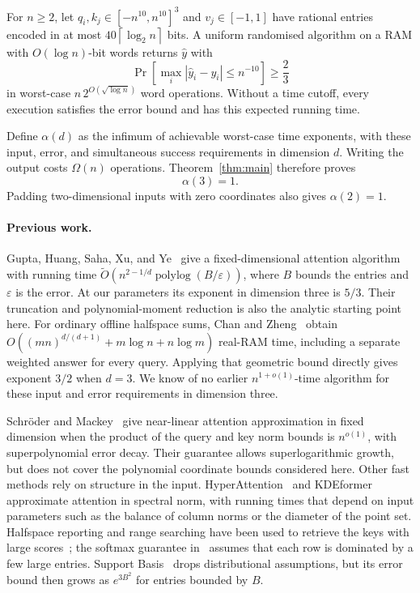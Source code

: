 \documentclass[notab,a4paper,UKenglish,numberwithinsect]{socg-lipics-v2021}
\newcommand{\polylog}{\operatorname{polylog}}
\newcommand{\eps}{\varepsilon}
\newcommand{\ceil}[1]{\left\lceil #1\right\rceil}
\begin{document}
\begin{theorem}\label{thm:main}
For $n\ge2$, let $q_i,k_j\in[-n^{10},n^{10}]^3$ and $v_j\in[-1,1]$ have rational entries encoded in at most $40\ceil{\log_2 n}$ bits. A uniform randomised algorithm on a RAM with $O(\log n)$-bit words returns $\widehat y$ with
\[
 \Pr\!\left[\max_i|\widehat y_i-y_i|\le n^{-10}\right]\ge\frac23
\]
in worst-case $n\,2^{O(\sqrt{\log n})}$ word operations. Without a time cutoff, every execution satisfies the error bound and has this expected running time.
\end{theorem}

Define $\alpha(d)$ as the infimum of achievable worst-case time exponents, with these input, error, and simultaneous success requirements in dimension $d$. Writing the output costs $\Omega(n)$ operations. Theorem~\ref{thm:main} therefore proves
\begin{equation}\label{eq:alpha}
 \alpha(3)=1.
\end{equation}
Padding two-dimensional inputs with zero coordinates also gives $\alpha(2)=1$.

\paragraph*{Previous work.}
Gupta, Huang, Saha, Xu, and Ye~\cite[Theorem 1.1]{gupta} give a fixed-dimensional attention algorithm with running time $\widetilde O(n^{2-1/d}\polylog(B/\eps))$, where $B$ bounds the entries and $\eps$ is the error. At our parameters its exponent in dimension three is $5/3$. Their truncation and polynomial-moment reduction is also the analytic starting point here. For ordinary offline halfspace sums, Chan and Zheng~\cite[Theorem 5.3]{chan-zheng} obtain $O((mn)^{d/(d+1)}+m\log n+n\log m)$ real-RAM time, including a separate weighted answer for every query. Applying that geometric bound directly gives exponent $3/2$ when $d=3$. We know of no earlier $n^{1+o(1)}$-time algorithm for these input and error requirements in dimension three.

Schr\"oder and Mackey~\cite[Corollary 2]{wildcat} give near-linear attention approximation in fixed dimension when the product of the query and key norm bounds is $n^{o(1)}$, with superpolynomial error decay. Their guarantee allows superlogarithmic growth, but does not cover the polynomial coordinate bounds considered here. Other fast methods rely on structure in the input. HyperAttention~\cite{hyperattention} and KDEformer~\cite{kdeformer} approximate attention in spectral norm, with running times that depend on input parameters such as the balance of column norms or the diameter of the point set. Halfspace reporting and range searching have been used to retrieve the keys with large scores~\cite{hsr,louver}; the softmax guarantee in~\cite{hsr} assumes that each row is dominated by a few large entries. Support Basis~\cite{support-basis} drops distributional assumptions, but its error bound then grows as $e^{3B^2}$ for entries bounded by $B$.
\end{document}
